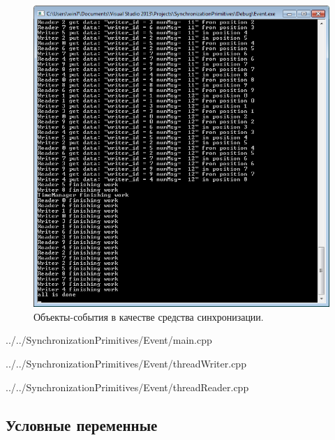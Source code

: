 \documentclass[a4paper, 12pt]{article}		%
\begin{document}
\begin{figure}[h!]
\centering
\includegraphics[scale=1]{res/004}
\caption{Объекты-события в качестве средства синхронизации.}
\end{figure}


{../../SynchronizationPrimitives/Event/main.cpp}


{../../SynchronizationPrimitives/Event/threadWriter.cpp}


{../../SynchronizationPrimitives/Event/threadReader.cpp}

\newpage
\subsection{Условные переменные}
\end{document}
